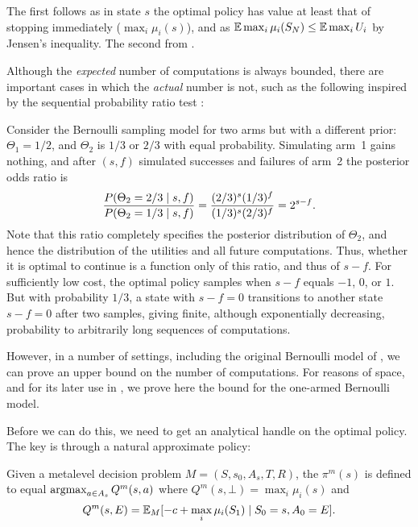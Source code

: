 \begin{hiddenproof}
	The first follows as in state $s$ the optimal policy has value at least that
	of stopping immediately ($\max_i \mu_i(s)$), and as $\mathbb{E} \max_i\mu_i(S_N) \le \mathbb{E} \max_i U_i$ by Jensen's inequality.
	The second from .
\end{hiddenproof}

Although the \emph{expected} number of computations is always bounded,
there are important cases in which the \emph{actual} number is not, such as
the following inspired by the sequential probability ratio test \citep{Wald+1945}:

\begin{example}\label{example:sprt}
Consider the Bernoulli sampling model for two arms but with a different prior:
	$\Theta_1=1/2$,
	and $\Theta_2$ is $1/3$ or $2/3$ with equal probability.
%
Simulating arm~1 gains nothing, and after $(s,f)$ simulated successes and failures of arm~2
the posterior odds ratio is
\[
	\frac{P(\Theta_2=2/3\mid s,f)}{P(\Theta_2=1/3\mid s,f)} = \frac{(2/3)^s(1/3)^f}{(1/3)^s(2/3)^f}= 2^{s-f}.
\]
Note that this ratio completely specifies the posterior distribution of $\Theta_2$,
and hence the distribution of the utilities and all future computations.  Thus, whether
it is optimal to continue is a function only of this ratio, and thus of $s-f$.
For sufficiently low cost, the 
optimal policy samples when $s-f$ equals $-1$, $0$, or $1$.  But with probability
$1/3$, a state with $s-f=0$ transitions to another state $s-f=0$ after two samples, 
giving finite, although exponentially decreasing, probability to arbitrarily long 
sequences of computations.
\end{example}


However, in a number of settings, including the original Bernoulli model of ,
we can prove an upper bound on the number of computations.  For reasons of space,
and for its later use in , we prove here the bound for the one-armed Bernoulli model.

Before we can do this, we need to get an analytical handle on the optimal policy.
The key is through a natural approximate policy:

\begin{dfn}\label{dfn:myopic}
	Given a metalevel decision problem $M=(S,s_0,A_s,T,R)$,
	the  $\pi^m(s)$ is defined to equal $\operatorname*{argmax}_{a\in A_s} Q^m(s,a)$ 
	where $Q^m(s,\bot) = \max_i \mu_i(s)$ and
	\begin{equation*}%
		 Q^m(s,E) = \IE_M[ -c + \max_i \mu_i(S_1) \given S_0 = s, A_0 = E].		
	\end{equation*}
\end{dfn}

